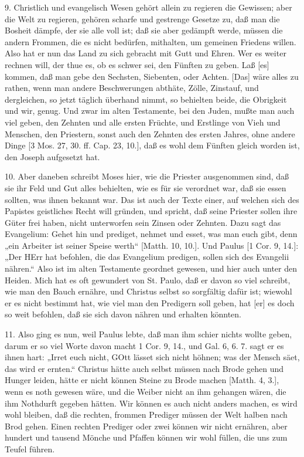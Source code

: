 9. Christlich und evangelisch Wesen gehört allein zu regieren die Gewissen; aber die Welt zu regieren, gehören scharfe und gestrenge Gesetze zu, daß man die Bosheit dämpfe, der sie alle voll ist; daß sie aber gedämpft werde, müssen die andern Frommen, die es nicht bedürfen, mithalten, um gemeinen Friedens willen. Also hat er nun das Land zu sich gebracht mit Gutt und Ehren. Wer es weiter rechnen will, der thue es, ob es schwer sei, den Fünften zu geben. Laß [es] kommen, daß man gebe den Sechsten, Siebenten, oder Achten. [Das] wäre alles zu rathen, wenn man andere Beschwerungen abthäte, Zölle, Zinstauf, und dergleichen, so jetzt täglich überhand nimmt, so behielten beide, die Obrigkeit und wir, genug. Und zwar im alten Testamente, bei den Juden, mußte man auch viel geben, den Zehnten und alle ersten Früchte, und Erstlinge von Vieh und Menschen, den Priestern, sonst auch den Zehnten des ersten Jahres, ohne andere Dinge [3 Mos. 27, 30. ff. Cap. 23, 10.], daß es wohl dem Fünften gleich worden ist, den Joseph aufgesetzt hat.

10. Aber daneben schreibt Moses hier, wie die Priester ausgenommen sind, daß sie ihr Feld und Gut alles behielten, wie es für sie verordnet war, daß sie essen sollten, was ihnen bekannt war. Das ist auch der Texte einer, auf welchen sich des Papistes geistliches Recht will gründen, und spricht, daß seine Priester sollen ihre Güter frei haben, nicht unterworfen sein Zinsen oder Zehnten. Dazu sagt das Evangelium: Gehet hin und prediget, nehmet und esset, was man euch gibt, denn „ein Arbeiter ist seiner Speise werth“ [Matth. 10, 10.]. Und Paulus [1 Cor. 9, 14.]: „Der HErr hat befohlen, die das Evangelium predigen, sollen sich des Evangelii nähren.“ Also ist im alten Testamente geordnet gewesen, und hier auch unter den Heiden. Mich hat es oft gewundert von St. Paulo, daß er davon so viel schreibt, wie man den Bauch ernähre, und Christus selbst so sorgfältig dafür ist; wiewohl er es nicht bestimmt hat, wie viel man den Predigern soll geben, hat [er] es doch so weit befohlen, daß sie sich davon nähren und erhalten könnten.

11. Also ging es nun, weil Paulus lebte, daß man ihm schier nichts wollte geben, darum er so viel Worte davon macht 1 Cor. 9, 14., und Gal. 6, 6. 7. sagt er es ihnen hart: „Irret euch nicht, GOtt lässet sich nicht höhnen; was der Mensch säet, das wird er ernten.“ Christus hätte auch selbst müssen nach Brode gehen und Hunger leiden, hätte er nicht können Steine zu Brode machen [Matth. 4, 3.], wenn es noth gewesen wäre, und die Weiber nicht an ihm gehangen wären, die ihm Nothdurft gegeben hätten. Wir können es auch nicht anders machen, es wird wohl bleiben, daß die rechten, frommen Prediger müssen der Welt halben nach Brod gehen. Einen rechten Prediger oder zwei können wir nicht ernähren, aber hundert und tausend Mönche und Pfaffen können wir wohl füllen, die uns zum Teufel führen.

